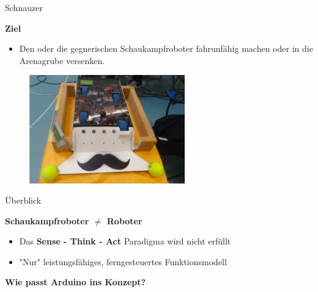 \documentclass{beamer}
\begin{document}
\begin{frame}{Schnauzer}
\begin{large}\textbf{Ziel}\end{large}
\begin{itemize}
	\item Den oder die gegnerischen Schaukampfroboter fahrunf\"ahig machen oder in die Arenagrube versenken. \href{./videos/schnauzer.mp4}{}
\end{itemize}
 \begin{figure}[H]
  \centering
  \includegraphics[width=0.6\textwidth]{./images/robot-schnauzer.jpg}
 \end{figure}
\end{frame}
\begin{frame}{\"Uberblick}
\begin{large}\textbf{Schaukampfroboter $\neq$ Roboter}\end{large}
\begin{itemize}
	\item Das \textbf{Sense - Think - Act} Paradigma wird nicht erf\"ullt
	\item "Nur" leistungsf\"ahiges, ferngesteuertes Funktionsmodell
\end{itemize}
\vspace{20px}
\begin{large}\textbf{Wie passt Arduino ins Konzept?}\end{large}
\end{frame}
\end{document}
